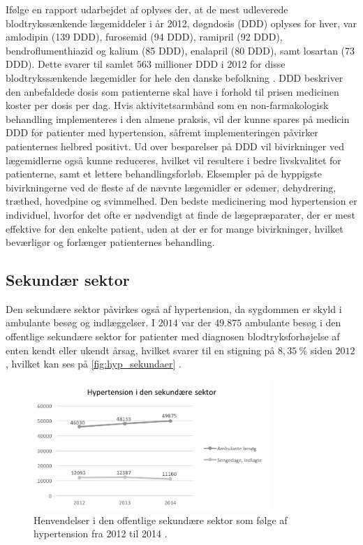 Ifølge en rapport udarbejdet af \citeauthor{apotekerforeningen2012} oplyses der, at de mest udleverede blodtrykssænkende lægemiddeler i år 2012, døgndosis (DDD) oplyses for hver, var amlodipin (139 DDD), furosemid (94 DDD), ramipril (92 DDD), bendroflumenthiazid og kalium (85 DDD), enalapril (80 DDD), samt losartan (73 DDD). Dette svarer til samlet $563$ millioner DDD i 2012 for disse blodtrykssænkende lægemidler for hele den danske befolkning \citep{apotekerforeningen2012}. DDD beskriver den anbefaldede dosis som patienterne skal have i forhold til prisen medicinen koster per dosis per dag. Hvis aktivitetsarmbånd som en non-farmakologisk  behandling implementeres i den almene praksis, vil der kunne spares på medicin DDD for patienter med hypertension, såfremt implementeringen påvirker patienternes helbred positivt. Ud over besparelser på DDD vil bivirkninger ved lægemidlerne også kunne reduceres, hvilket vil resultere i bedre livskvalitet for patienterne, samt et lettere behandlingsforløb. Eksempler på de hyppigste bivirkningerne ved de fleste af de nævnte lægemidler er ødemer, dehydrering, træthed, hovedpine og svimmelhed. Den bedste medicinering mod hypertension er individuel, hvorfor det ofte er nødvendigt at finde de lægepræparater, der er mest effektive for den enkelte patient, uden at der er for mange bivirkninger, hvilket beværligør og forlænger patienternes behandling.  

\subsection{Sekundær sektor}
Den sekundære sektor påvirkes også af hypertension, da sygdommen er skyld i ambulante besøg og indlæggelser. I $2014$ var der $49.875$ ambulante besøg i den offentlige sekundære sektor for patienter med diagnosen blodtryksforhøjelse af enten kendt eller ukendt årsag, hvilket svarer til en stigning på $8,35~\%$ siden $2012$, hvilket kan ses på \autoref{fig:hyp_sekundaer} \citep{sundhedsdatastyrelsen2016}. 

\begin{figure}[H]
\centering
\includegraphics[width=0.8\textwidth]{figures/hyp_sekundaer}
\caption{Henvendelser i den offentlige sekundære sektor som følge af hypertension fra 2012 til 2014 \citep{sundhedsdatastyrelsen2016}.}
\label{fig:hyp_sekundaer}
\end{figure}

